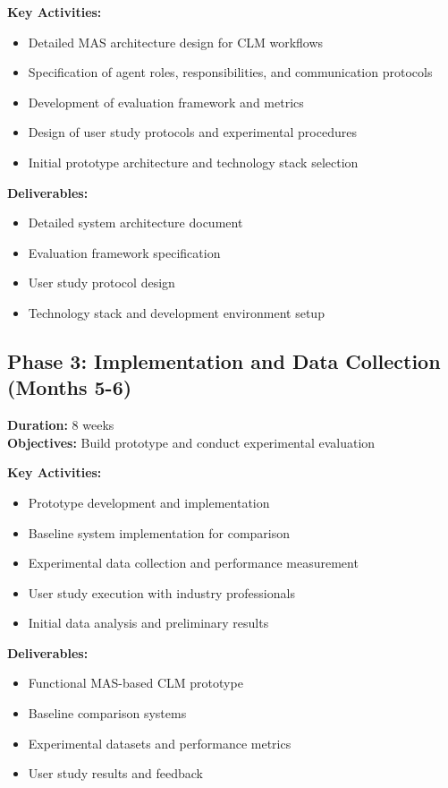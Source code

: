 \textbf{Key Activities:}
\begin{itemize}
    \item Detailed MAS architecture design for CLM workflows
    \item Specification of agent roles, responsibilities, and communication protocols
    \item Development of evaluation framework and metrics
    \item Design of user study protocols and experimental procedures
    \item Initial prototype architecture and technology stack selection
\end{itemize}

\textbf{Deliverables:}
\begin{itemize}
    \item Detailed system architecture document
    \item Evaluation framework specification
    \item User study protocol design
    \item Technology stack and development environment setup
\end{itemize}

\subsection{Phase 3: Implementation and Data Collection (Months 5-6)}
\textbf{Duration:} 8 weeks\\
\textbf{Objectives:} Build prototype and conduct experimental evaluation

\textbf{Key Activities:}
\begin{itemize}
    \item Prototype development and implementation
    \item Baseline system implementation for comparison
    \item Experimental data collection and performance measurement
    \item User study execution with industry professionals
    \item Initial data analysis and preliminary results
\end{itemize}

\textbf{Deliverables:}
\begin{itemize}
    \item Functional MAS-based CLM prototype
    \item Baseline comparison systems
    \item Experimental datasets and performance metrics
    \item User study results and feedback
\end{itemize}

